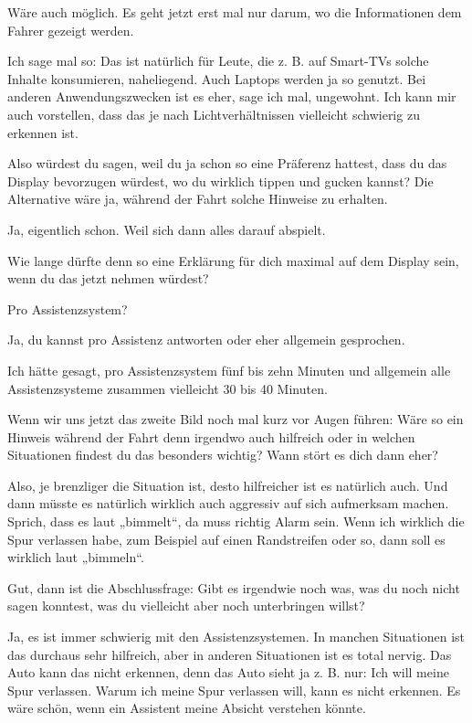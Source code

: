 \interviewerin
Wäre auch möglich. Es geht jetzt erst mal nur darum, wo die
Informationen dem Fahrer gezeigt werden.

Ich sage mal so: Das ist natürlich für Leute, die z. B. auf Smart-TVs
solche Inhalte konsumieren, naheliegend. Auch Laptops werden ja so
genutzt. Bei anderen Anwendungszwecken ist es eher, sage ich mal,
ungewohnt. Ich kann mir auch vorstellen, dass das je nach
Lichtverhältnissen vielleicht schwierig zu erkennen ist.

\interviewerin
Also würdest du sagen, weil du ja schon so eine Präferenz hattest, dass
du das Display bevorzugen würdest, wo du wirklich tippen und gucken
kannst? Die Alternative wäre ja, während der Fahrt solche Hinweise zu
erhalten.

Ja, eigentlich schon. Weil sich dann alles darauf abspielt.

\interviewerin
Wie lange dürfte denn so eine Erklärung für dich maximal auf dem
Display sein, wenn du das jetzt nehmen würdest?

Pro Assistenzsystem?

\interviewerin
Ja, du kannst pro Assistenz antworten oder eher allgemein gesprochen.

Ich hätte gesagt, pro Assistenzsystem fünf bis zehn Minuten und
allgemein alle Assistenzsysteme zusammen vielleicht 30 bis 40 Minuten.

\interviewerin
Wenn wir uns jetzt das zweite Bild noch mal kurz vor Augen führen: Wäre
so ein Hinweis während der Fahrt denn irgendwo auch hilfreich oder in
welchen Situationen findest du das besonders wichtig? Wann stört es
dich dann eher?

Also, je brenzliger die Situation ist, desto hilfreicher ist es
natürlich auch. Und dann müsste es natürlich wirklich auch aggressiv auf
sich aufmerksam machen. Sprich, dass es laut „bimmelt“, da muss richtig
Alarm sein. Wenn ich wirklich die Spur verlassen habe, zum Beispiel auf
einen Randstreifen oder so, dann soll es wirklich laut „bimmeln“.

\interviewerin
Gut, dann ist die Abschlussfrage: Gibt es irgendwie noch was, was du
noch nicht sagen konntest, was du vielleicht aber noch unterbringen
willst?

Ja, es ist immer schwierig mit den Assistenzsystemen. In manchen
Situationen ist das durchaus sehr hilfreich, aber in anderen Situationen
ist es total nervig. Das Auto kann das nicht erkennen, denn das Auto
sieht ja z. B. nur: Ich will meine Spur verlassen. Warum ich meine Spur
verlassen will, kann es nicht erkennen. Es wäre schön, wenn ein
Assistent meine Absicht verstehen könnte.

